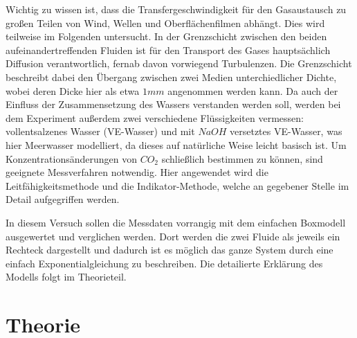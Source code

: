 \documentclass[12pt]{article}
\begin{document}
Wichtig zu wissen ist, dass die Transfergeschwindigkeit für den Gasaustausch zu großen Teilen von Wind, Wellen und Oberflächenfilmen abhängt. Dies wird teilweise im Folgenden untersucht. In der Grenzschicht zwischen den beiden aufeinandertreffenden Fluiden ist für den Transport des Gases hauptsächlich Diffusion verantwortlich, fernab davon vorwiegend Turbulenzen. Die Grenzschicht beschreibt dabei den Übergang zwischen zwei Medien unterchiedlicher Dichte, wobei deren Dicke hier als etwa $1 mm$ angenommen werden kann.
Da auch der Einfluss der Zusammensetzung des Wassers verstanden werden soll, werden bei dem Experiment außerdem zwei verschiedene Flüssigkeiten vermessen: vollentsalzenes Wasser (VE-Wasser) und mit $NaOH$ versetztes VE-Wasser, was hier Meerwasser modelliert, da dieses auf natürliche Weise leicht basisch ist. Um Konzentrationsänderungen von $CO_2$ schließlich bestimmen zu können, sind geeignete Messverfahren notwendig. Hier angewendet wird die Leitfähigkeitsmethode und die Indikator-Methode, welche an gegebener Stelle im Detail aufgegriffen werden.

In diesem Versuch sollen die Messdaten vorrangig mit dem einfachen Boxmodell ausgewertet und verglichen werden. Dort werden die zwei Fluide als jeweils ein Rechteck dargestellt und dadurch ist es möglich das ganze System durch eine einfach Exponentialgleichung zu beschreiben. Die detailierte Erklärung des Modells folgt im Theorieteil.

\section{Theorie}\label{1}
\end{document}
